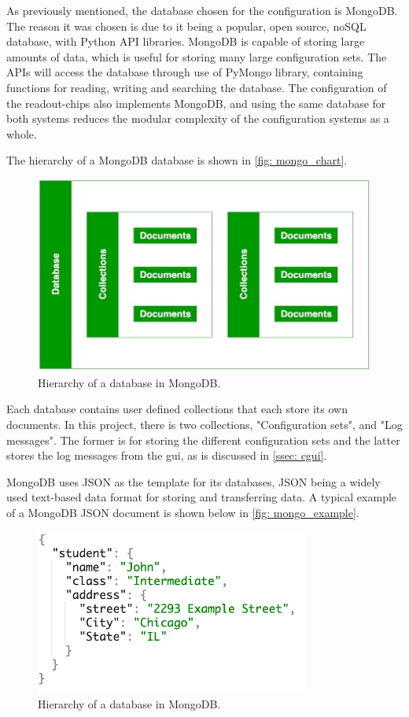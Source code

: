 \documentclass[main.tex]{subfiles}
\begin{document}
As previously mentioned, the database chosen for the configuration is MongoDB. The reason it was chosen is due to it being a popular, open source, noSQL database, with Python API libraries. MongoDB is capable of storing large amounts of data, which is useful for storing many large configuration sets. The APIs will access the database through use of PyMongo library, containing functions for reading, writing and searching the database. The configuration of the readout-chips also implements MongoDB, and using the same database for both systems reduces the modular complexity of the configuration systems as a whole.

The hierarchy of a MongoDB database is shown in \autoref{fig: mongo_chart}.

\begin{figure}[!ht]
    \centering
    \includegraphics[width=12cm, scale=1.5]{images/mongodb-nosql-working.jpg}
    \caption{Hierarchy of a database in MongoDB.}
    \label{fig: mongo_chart}
\end{figure}
\FloatBarrier

Each database contains user defined collections that each store its own documents. In this project, there is two collections, "Configuration sets", and "Log messages". The former is for storing the different configuration sets and the latter stores the log messages from the \gls{gui}, as is discussed in \autoref{ssec: cgui}.

MongoDB uses JSON as the template for its databases, JSON being a widely used text-based data format for storing and transferring data. A typical example of a MongoDB JSON document is shown below in \autoref{fig: mongo_example}.

\begin{figure}[!ht]
    \centering
    \includegraphics[width=9cm, scale=1.5]{images/mongodb_document_example.png}
    \caption{Hierarchy of a database in MongoDB.}
    \label{fig: mongo_example}
\end{figure}
\FloatBarrier
\end{document}
